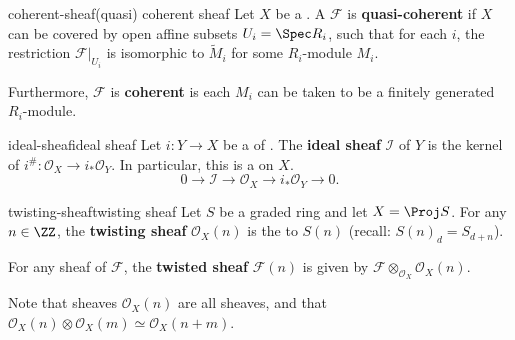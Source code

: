 \begin{topic}{coherent-sheaf}{(quasi) coherent sheaf}
    Let $X$ be a . A  $\mathcal{F}$ is \textbf{quasi-coherent} if $X$ can be covered by open affine subsets $U_i = \Spec R_i$, such that for each $i$, the restriction $\mathcal{F}|_{U_i}$ is isomorphic to $\tilde{M}_i$ for some $R_i$-module $M_i$.
    
    Furthermore, $\mathcal{F}$ is \textbf{coherent} is each $M_i$ can be taken to be a finitely generated $R_i$-module.
\end{topic}

\begin{topic}{ideal-sheaf}{ideal sheaf}
    Let $i : Y \to X$ be a  of . The \textbf{ideal sheaf} $\mathcal{I}$ of $Y$ is the kernel of $i^\# : \mathcal{O}_X \to i_* \mathcal{O}_Y$. In particular, this is a  on $X$.
    \[ 0 \to \mathcal{I} \to \mathcal{O}_X \to i_* \mathcal{O}_Y \to 0 . \]
\end{topic}

\begin{topic}{twisting-sheaf}{twisting sheaf}
    Let $S$ be a graded ring and let $X = \Proj S$. For any $n \in \ZZ$, the \textbf{twisting sheaf} $\mathcal{O}_X(n)$ is the  to $S(n)$ (recall: $S(n)_d = S_{d + n}$).
    
    For any sheaf of  $\mathcal{F}$, the \textbf{twisted sheaf} $\mathcal{F}(n)$ is given by $\mathcal{F} \otimes_{\mathcal{O}_X} \mathcal{O}_X(n)$.
    
    Note that sheaves $\mathcal{O}_X(n)$ are all  sheaves, and that $\mathcal{O}_X(n) \otimes \mathcal{O}_X(m) \simeq \mathcal{O}_X(n + m)$.
\end{topic}

    

